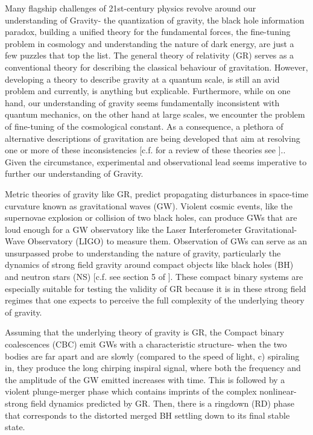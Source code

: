 Many flagship challenges of 21st-century physics revolve around our understanding of Gravity- the quantization of gravity, the black hole information paradox, building a unified theory for the fundamental forces, the fine-tuning problem in cosmology and understanding the nature of dark energy, are just a few puzzles that top the list. The general theory of relativity (GR) serves as a conventional theory for describing the classical behaviour of gravitation. However, developing a theory to describe gravity at a quantum scale, is still an avid problem and currently, is anything but explicable. Furthermore, while on one hand, our understanding of gravity seems fundamentally inconsistent with quantum mechanics, on the other hand at large scales, we encounter the problem of fine-tuning of the cosmological constant. As a consequence, a plethora of alternative descriptions of gravitation are being developed that aim at resolving one or more of these inconsistencies [c.f. for a review of these theories see \cite{ReviewAlternativeTheories1,ReviewAlternativeTheories2}].. Given the circumstance, experimental and observational lead seems imperative to further our understanding of Gravity.

Metric theories of gravity like GR, predict propagating disturbances in space-time curvature known as gravitational waves (GW). Violent cosmic events, like the supernovae explosion or collision of two black holes, can produce GWs that are loud enough for a GW observatory like the Laser Interferometer Gravitational-Wave Observatory (LIGO) to measure them. Observation of GWs can serve as an unsurpassed probe to understanding the nature of gravity, particularly the dynamics of strong field gravity around compact objects like black holes (BH) and neutron stars (NS) [c.f. see section 5 of \cite{ReviewAlternativeTheories1}]. These compact binary systems are especially suitable for testing the validity of GR because it is in these strong field regimes that one expects to perceive the full complexity of the underlying theory of gravity. 

Assuming that the underlying theory of gravity is GR, the Compact binary coalescences (CBC) emit GWs with a characteristic structure- when the two bodies are far apart and are slowly (compared to the speed of light, c) spiraling in, they produce the long chirping inspiral  signal, where both the frequency and the amplitude of the GW emitted increases with time. This is followed by a violent plunge-merger phase which contains imprints of the complex nonlinear-strong field dynamics predicted by GR. Then, there is a ringdown (RD) phase that corresponds to the distorted merged BH settling down to its final stable state.  

